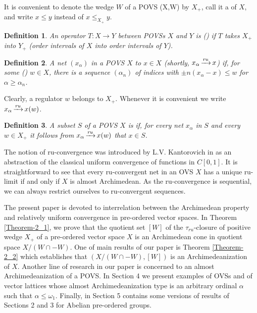 \documentclass[10pt]{article}
\newtheorem{definition}{Definition}[section]
\DeclareMathOperator{\convr}{\xrightarrow[]{{\it ru}}}
\renewcommand{\a}{\alpha}
\newcommand{\w}{\omega}
\begin{document}
\medskip
It is convenient to denote the wedge $W$ of a POVS (X,W) by $X_+$, call it a {\color{blue}{positive wedge}} of $X$, 
and write $x\leqslant y$ instead of $x\leqslant_{X_+} y$.

\begin{definition}\label{Definition-1_7}
An operator $T: X\to Y$ between POVSs $X$ and $Y$ is {\color{blue}{positive}} {\em (}{\color{blue}{order bounded}}{\em )} if $T$ takes $X_+$ into $Y_+$
{\em (}order intervals of $X$ into order intervals of $Y${\em )}.
\end{definition}

\begin{definition}\label{Definition-1_8}
A net $(x_{\a})$ in a POVS $X$ 
{\color{blue}{ru-converges}} to $x\in X$ {\em (}shortly, $x_{\a}\convr x${\em )} 
if, for some {\em (}{\color{blue}{regulator of the convergence}}{\em )} $w\in X$, there is a sequence 
$({\a}_n)$ of indices with $\pm n(x_{\a}-x)\leqslant w$ for ${\a}\geqslant{\a}_n$.
\end{definition}

\noindent
Clearly, a regulator $w$ belongs to $X_+$. Whenever it is convenient we write $x_{\a}\convr x(w)$. 

\begin{definition}\label{Definition-1_9}
A subset $S$ of a POVS $X$ is {\color{blue}{ru-closed}} if, for every net $x_{\a}$ in $S$ and every $w\in X_+$ it follows from $x_{\a}\convr x(w)$ that $x\in S$.
\end{definition}

\noindent
The notion of ru-convergence was introduced by L.V. Kantorovich in \cite{Kantorovich-1936} as
an abstraction of the classical uniform conver\-gence of functions in $C[0,1]$.
It is straightforward to see that every ru-convergent net in an OVS $X$ has a unique ru-limit if and only if $X$ is almost Archime\-dean.
As the ru-con\-vergence is sequential, we can always restrict ourselves to ru-convergent sequences.


\medskip
The present paper is devoted to interrelation between the Archime\-dean property and relatively uniform conver\-gence in pre-ordered vector spaces.
In Theorem \ref{Theorem-2_1}, we prove that the quotient set $[W]$ of the $\tau_{ru}$-closure of positive wedge $X_+$ of a pre-ordered vector space $X$
is an Archime\-dean cone in quotient space $X/(W\cap -W)$. One of main results of our paper is Theorem \ref{Theorem-2_2} which establishes
that $(X/(W\cap -W),[W])$ is an Archimedeanization of $X$. Another line of research in our paper is concerned to an almost Archimedeanization of a POVS.
In Section 4 we present examples of OVSs and of vector lattices whose almost Archimedeanization type is an arbitrary ordinal
$\a$ such that $\a\leqslant\w_1$. Finally, in Section 5 contains some versions of results of Sections 2 and 3 for Abelian pre-ordered groups.
\end{document}
